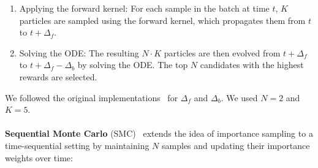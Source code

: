 \begin{enumerate}[leftmargin=*]
    \item Applying the forward kernel: For each sample in the batch at time $t$, $K$ particles are sampled using the forward kernel, which propagates them from $t$ to $t + \Delta_f$.
    \item Solving the ODE: The resulting $N \cdot K$ particles are then evolved from $t + \Delta_f$ to $t + \Delta_f - \Delta_b$ by solving the ODE. The top $N$ candidates with the highest rewards are selected.
\end{enumerate}
We followed the original implementations~\cite{Ma2025:SoP} for $\Delta_f$ and $\Delta_b$. We used $N=2$ and $K=5$.
\\
\vspace{0.5\baselineskip}
\\
% 
% 
\textbf{Sequential Monte Carlo} (SMC)~\cite{Kim:2025DAS, Doucet2001:SMC} 
extends the idea of importance sampling to a time-sequential setting by maintaining $N$ samples and updating their importance weights over time:
